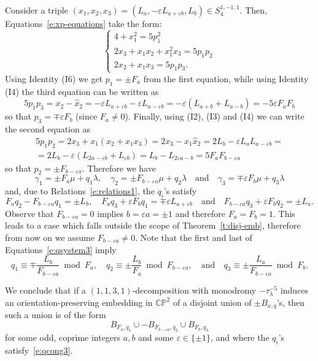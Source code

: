 \documentclass[11pt,a4paper]{amsart}
\newcommand{\CP}{\mathbb{CP}}
\newcommand{\ep}{\varepsilon}
\newcommand{\ga}{\gamma}
\newcommand{\la}{\lambda}
\theoremstyle{definition}
\numberwithin{equation}{section}
\begin{document}
Consider a triple $(x_1,x_2,x_3)=(L_a,-\ep L_{a+ \ep b},L_b) \in S_4^{1,-1,1}$. 
Then, Equations~\eqref{e:xp-equations} take the form:  
\begin{equation}
\begin{cases}
4 + x_1^2 = 5 p_1^2\\
2x_3 + x_1 x_2 + x_1^2 x_3 = 5 p_1 p_2\\
2x_2 + x_1 x_3 = 5 p_1 p_3.
\end{cases}
\end{equation}
Using Identity (I6) we get $p_1=\pm F_a$ from the first equation, 
while using Identity (I4) the third equation can be written as 
\[
5p_1p_3=x_2-\hat x_2=-\ep L_{a+\ep b}-\ep L_{a-\ep b}=
-\ep(L_{a+b}+L_{a-b})=-5 \ep F_a F_b
\]
so that $p_3=\mp \ep F_b$ (since $F_a \neq 0$). Finally, using (I2), (I3) and 
(I4) we can write the second equation as
\[
\begin{split} 
5p_1p_2=2x_3+x_1(x_2+x_1x_3)=2x_3-x_1 \hat x_2=2L_b-\ep L_a L_{a-\ep b}=\\
=2L_b-\ep (L_{2a-\ep b}+L_{\ep b})=L_b-L_{2 \ep a-b}=5F_aF_{b-\ep a}
\end{split} 
\]
so that $p_2=\pm F_{b-\ep a}$. Therefore we have
\begin{equation}\label{e:gammas}
\ga_1 = \pm F_a\mu + q_1\la,\quad 
\ga_2 = \pm F_{b-\ep a}\mu + q_2\la\quad\text{and}\quad
\ga_3 = \mp \ep F_b \mu + q_3\la  
\end{equation} 
and, due to Relations~\eqref{e:relations1}, the $q_i$'s satisfy 
\begin{equation}\label{e:qsystem3}
F_a q_2 - F_{b-\ep a} q_1 =  \pm L_b,\quad 
F_a q_3 + \ep F_b q_1 = \mp \ep L_{a+\ep b}\quad\text{and}\quad 
F_{b-\ep a} q_3 + \ep F_b q_2 = \pm L_a.
\end{equation} 
Observe that $F_{b-\ep a} = 0$ implies $b=\ep a=\pm 1$ and therefore $F_a=F_b=1$. 
This leads to a case which falls outside the scope of Theorem~\ref{t:disj-emb}, therefore from now on we assume $F_{b-\ep a} \neq 0$. 
Note that the first and last of Equations~\eqref{e:qsystem3} 
imply 
\begin{equation}\label{e:qcong3}
q_1\equiv\mp\frac{L_b}{F_{b-\ep a}}\bmod F_a,\quad 
q_2\equiv\pm\frac{L_b}{F_a}\bmod F_{b-\ep a},\quad\text{and}\quad  
q_3\equiv\pm\frac{L_a}{F_{b-\ep a}}\bmod F_b.
\end{equation}

We conclude that if a $(1,1,3,1)$-decomposition with monodromy $-\tau_\la^{-5}$ 
induces an orientation-preserving embedding in $\CP^2$ of a 
disjoint union of $\pm B_{x,q}$'s, then such a union is of the form 
\begin{equation}\label{e:tripleofballs1-11}
B_{F_a,q_1}\cup -B_{F_{b-\ep a},q_2}\cup B_{F_b,q_3}
\end{equation}
for some odd, coprime integers $a,b$ and some $\ep\in\{\pm 1\}$, and where the $q_i$'s 
satisfy~\eqref{e:qcong3}. 
\end{document}
